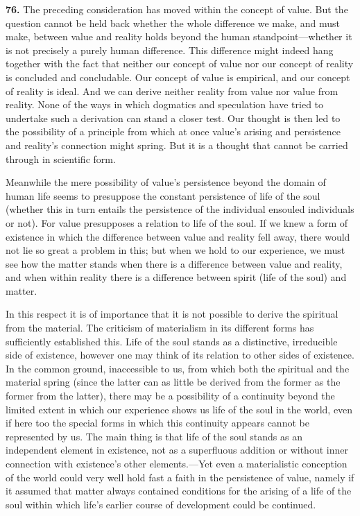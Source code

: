 \documentclass[12pt,a4paper]{book}
\newcommand{\opage}[1]{\marginnote{\footnotesize\textit{[#1]}}}
\begin{document}
\medskip

\noindent\textbf{76.} The preceding consideration has moved within the concept of value. But the
question cannot be held back whether the whole difference we make, and must make, between value and
reality holds beyond the human standpoint---whether it is not precisely a purely human difference. This
difference might indeed hang together with the fact that neither our concept of value nor our concept of
reality is concluded and concludable. Our concept of value is empirical, and our concept of reality is
ideal. And we can derive neither reality from value nor value from reality. None of the ways in which
dogmatics and 
\opage{177}speculation have tried to undertake such a derivation can stand a closer test. Our thought
is then led to the possibility of a principle from which at once value's arising and persistence and
reality's connection might spring. But it is a thought that cannot be carried through in scientific form.

Meanwhile the mere possibility of value's persistence beyond the domain of human life seems to
presuppose the constant persistence of life of the soul (whether this in turn entails the persistence of
the individual ensouled individuals or not). For value presupposes a relation to life of the soul. If we
knew a form of existence in which the difference between value and reality fell away, there would not lie
so great a problem in this; but when we hold to our experience, we must see how the matter stands when
there is a difference between value and reality, and when within reality there is a difference between
spirit (life of the soul) and matter.

In this respect it is of importance that it is not possible to derive the spiritual from the material.
The criticism of materialism in its different forms has sufficiently established this. Life of the soul
stands as a distinctive, irreducible side of existence, however one may think of its relation to other
sides of existence. In the common ground, inaccessible to us, from which both the spiritual and the
material spring (since the latter can as little be derived from the former as the former from the
latter), there may be a possibility of a continuity beyond the limited extent in which our experience
shows us life of the soul in the world, even if here too the special forms in which this continuity
appears cannot be represented by us. The main thing is that life of the soul stands as an independent
element in existence, not as a superfluous addition or without inner connection with existence's other
elements.---Yet even a materialistic conception of the world could very well hold fast a faith in the
persistence of value, namely if it assumed that matter always contained conditions for the arising of a
life of the soul within which life's earlier course of development could be continued.
\end{document}
